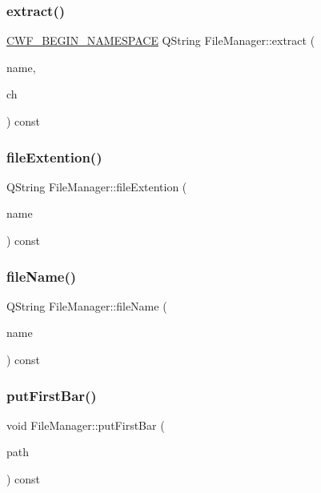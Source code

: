 \subsubsection{\texorpdfstring{extract()}{extract()}}
{\footnotesize\ttfamily \hyperlink{cppwebframework__global_8h_a7492e9498cbaf9cd17dbc2215d3a0e48}{C\+W\+F\+\_\+\+B\+E\+G\+I\+N\+\_\+\+N\+A\+M\+E\+S\+P\+A\+CE} Q\+String File\+Manager\+::extract (\begin{DoxyParamCaption}\item[{Q\+String \&}]{name,  }\item[{char}]{ch }\end{DoxyParamCaption}) const}

\mbox{\label{class_file_manager_a91752dbc36b0cd256d09917dbcf49f30}} 
\subsubsection{\texorpdfstring{file\+Extention()}{fileExtention()}}
{\footnotesize\ttfamily Q\+String File\+Manager\+::file\+Extention (\begin{DoxyParamCaption}\item[{Q\+String \&}]{name }\end{DoxyParamCaption}) const}

\mbox{\label{class_file_manager_af8ecdb77f87698fb34f4c65ae9cde87e}} 
\subsubsection{\texorpdfstring{file\+Name()}{fileName()}}
{\footnotesize\ttfamily Q\+String File\+Manager\+::file\+Name (\begin{DoxyParamCaption}\item[{Q\+String \&}]{name }\end{DoxyParamCaption}) const}

\mbox{\label{class_file_manager_a1fac5226f52353dd6e928ce25ae5c1cb}} 
\subsubsection{\texorpdfstring{put\+First\+Bar()}{putFirstBar()}}
{\footnotesize\ttfamily void File\+Manager\+::put\+First\+Bar (\begin{DoxyParamCaption}\item[{Q\+String \&}]{path }\end{DoxyParamCaption}) const}

